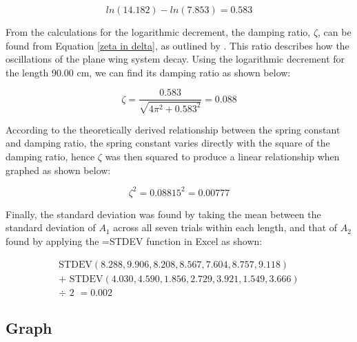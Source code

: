 \documentclass[12pt]{article}
\begin{document}
\vspace{-5mm}

\begin{equation}
    ln(14.182) - ln(7.853) = 0.583
\end{equation}

From the calculations for the logarithmic decrement, the damping ratio, $\zeta$, can be found from Equation \ref{zeta in delta}, as outlined by \citeauthor{miller_mattuck}. This ratio describes how the oscillations of the plane wing system decay. Using the logarithmic decrement for the length 90.00 cm, we can find its damping ratio as shown below:

\vspace{-10mm}

\begin{equation}
    \zeta = \frac{0.583}{\sqrt{4\pi^2+0.583^2}} = 0.088
\end{equation}

According to the theoretically derived relationship between the spring constant and damping ratio, the spring constant varies directly with the square of the damping ratio, hence $\zeta$ was then squared to produce a linear relationship when graphed as shown below:

\vspace{-5mm}

\begin{equation}
    \zeta^2 = 0.08815^2 = 0.00777
\end{equation}

Finally, the standard deviation was found by taking the mean between the standard deviation of $A_1$ across all seven trials within each length, and that of $A_2$ found by applying the =STDEV function in Excel as shown:

\vspace{-10mm}

$$
\begin{array}{l}
    \text{STDEV}(8.288,9.906,8.208,8.567,7.604,8.757,9.118) \\
    + \text{ STDEV}(4.030,4.590,1.856,2.729,3.921,1.549,3.666) \\
    \div \text{ 2 } = 0.002
 \end{array} 
$$

\subsection{Graph}
\end{document}
